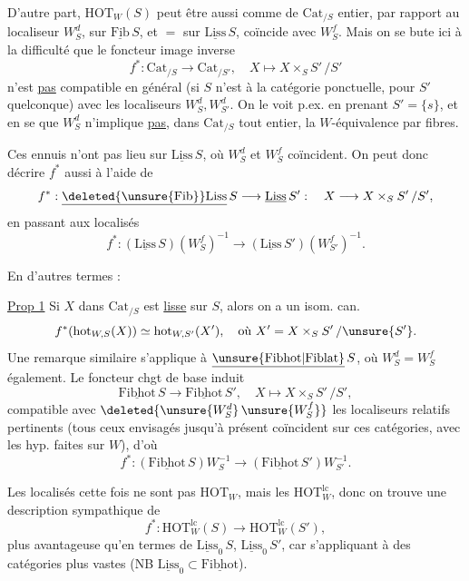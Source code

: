 D'autre part, $\mathrm{HOT}_W(S)$ peut être  aussi comme  de $\mathrm{Cat}_{/S}$  entier, par rapport au localiseur $W_S^d$,  sur $\underline{\mathrm{Fib}}\,S$, et $=$ sur $\underline{\mathrm{Liss}}\,S$, coïncide avec $W_S^f$. Mais on se bute ici à la difficulté que le foncteur image inverse
\[
f^*:\mathrm{Cat}_{/S}\longrightarrow\mathrm{Cat}_{/S'},\quad X\longmapsto X\times_S S'\,/S'
\]
n'est \uline{pas} compatible en général (si $S$ n'est  à la catégorie ponctuelle, pour $S'$ quelconque) avec les localiseurs $W_S^d,W_{S'}^d$. On le voit p.ex. en prenant $S'=\{s\}$, et en se  que $W_S^d$ n'implique \uline{pas}, dans $\mathrm{Cat}_{/S}$ tout entier, la $W$-équivalence par fibres.

Ces ennuis n'ont pas lieu sur $\underline{\mathrm{Liss}}\,S$, où $W_S^d$ et $W_S^f$ coïncident. On peut donc décrire $f^*$  aussi à l'aide de
\[
f^*:\underline{\deleted{\unsure{\mathrm{Fib}}}\mathrm{Liss}}\,S\longrightarrow\underline{\mathrm{Liss}}\,S':\quad X\longrightarrow X\times_S S'\,/S',
\]
en passant aux localisés
\[
f^*:(\underline{\mathrm{Liss}}\,S)(W_S^f)^{-1}\longrightarrow(\underline{\mathrm{Liss}}\,S')(W_{S'}^f)^{-1}.
\]

En d'autres termes :

\uline{Prop 1} Si $X$ dans $\mathrm{Cat}_{/S}$ est \uline{lisse} sur $S$, alors on a un isom. can.
\[
f^*(\mathrm{hot}_{W,S}(X))\simeq\mathrm{hot}_{W,S'}(X'),\quad\text{où }X'=X\times_S S'\,/\unsure{S'}.
\]
Une remarque similaire s'applique à $\underline{\unsure{\mathrm{Fibhot}|\mathrm{Fiblat}}}\,S$, où $W_S^d=W_S^f$ également. Le foncteur chgt de base induit
\[
\underline{\mathrm{Fibhot}}\,S\longrightarrow\underline{\mathrm{Fibhot}}\,S',\quad X\longmapsto X\times_S S'\,/S',
\]
compatible avec $\deleted{\unsure{W_S^d}\,\unsure{W_S^f}}$ les localiseurs relatifs pertinents (tous ceux envisagés jusqu'à présent coïncident sur ces catégories, avec les hyp. faites sur $W$), d'où
\[
f^*:(\underline{\mathrm{Fibhot}}\,S)W_S^{-1}\longrightarrow(\underline{\mathrm{Fibhot}}\,S')W_{S'}^{-1}.
\]

Les localisés cette fois ne sont pas  $\mathrm{HOT}_W$, mais les $\mathrm{HOT}^{\mathrm{lc}}_W$, donc on trouve une description sympathique de
\[
f^*:\mathrm{HOT}^{\mathrm{lc}}_W(S)\longrightarrow\mathrm{HOT}^{\mathrm{lc}}_W(S'),
\]
plus avantageuse  qu'en  termes de $\underline{\mathrm{Liss}}_0\,S$, $\underline{\mathrm{Liss}}_0\,S'$, car s'appliquant à des catégories  plus vastes (NB $\underline{\mathrm{Liss}}_0\subset\underline{\mathrm{Fibhot}}$).

